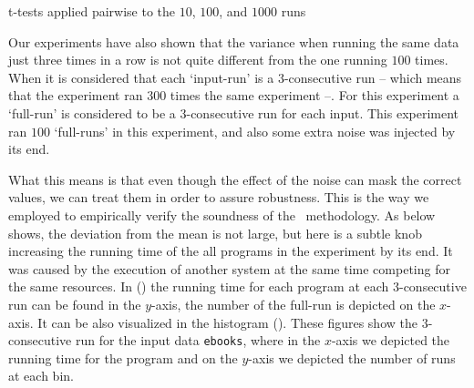 \begin{table}
  \centering
  \begin{tiny}
  
  \end{tiny}
  \caption{t-tests applied pairwise to the $10$, $100$, and $1000$ runs}
  \label{tab:ttest}
\end{table}

Our experiments have also shown that the variance when running the same data just three times in a row is not quite different from the one running $100$ times. When it is considered that each `input-run' is a $3$-consecutive run -- which means that the experiment ran $300$ times the same experiment --. For this experiment a `full-run' is considered to be a $3$-consecutive run for each input. This experiment ran $100$ `full-runs' in this experiment, and also some extra noise was injected by its end.

What this means is that even though the effect of the noise can mask the correct values, we can treat them in order to assure robustness. This is the way we employed to empirically verify the soundness of the \CP\ methodology. As  below shows, the deviation from the mean is not large, but here is a subtle knob increasing the running time of the all programs in the experiment by its end. It was caused by the execution of another system at the same time competing for the same resources. In () the running time for each program at each 3-consecutive run can be found in the $y$-axis, the number of the full-run is depicted on the $x$-axis. It can be also visualized in the histogram (). These figures show the $3$-consecutive run for the input data {\tt ebooks}, where in the $x$-axis we depicted the running time for the program and on the $y$-axis we depicted the number of runs at each bin.

